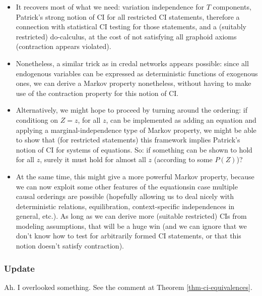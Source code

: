 \begin{itemize}
\begin{itemize}
      \item It recovers most of what we need: variation independence for $T$ components, 
        Patrick's strong notion of CI for all restricted CI statements,
        therefore a connection with statistical CI testing for those statements,
        and a (suitably restricted) do-calculus,
        at the cost of not satisfying all graphoid axioms (contraction appears violated).
      \item Nonetheless, a similar trick as in credal networks appears possible: since all endogenous variables can be expressed as deterministic functions of exogenous ones, we can derive a Markov property nonetheless, without having to make use of the contraction property for this notion of CI.
      \item Alternatively, we might hope to proceed by turning around the ordering: if conditiong on $Z=z$, for all $z$, can be implemented as adding an equation and applying a marginal-independence type of Markov property, we might be able to show that (for restricted statements) this framework implies Patrick's notion of CI for systems of equations.
        So: if something can be shown to hold for all $z$, surely it must hold for almost all $z$ (according to some $P(Z)$)?
      \item At the same time, this might give a more powerful Markov property, because we can now exploit some other features of the equationsin case multiple causal orderings are possible (hopefully allowing us to deal nicely with deterministic relations, equilibration, context-specific independences in general, etc.). As long as we can derive more (suitable restricted) CIs from modeling assumptions, that will be a huge win (and we can ignore that we don't know how to test for arbitrarily formed CI statements, or that this notion doesn't satisfy contraction).
    \end{itemize}
\end{itemize}

\subsubsection{Update}

Ah. I overlooked something.  See the comment at Theorem \ref{thm-ci-equivalences}.
